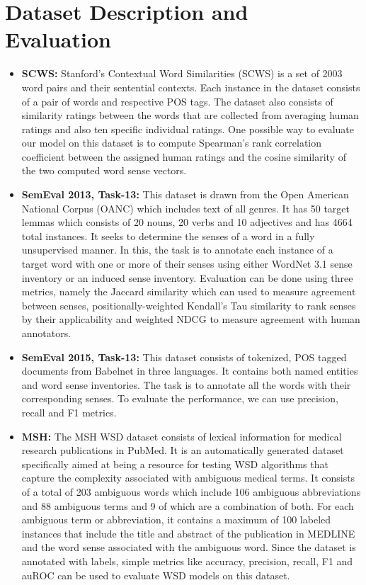 \documentclass{article}
\begin{document}
\section{Dataset Description and Evaluation}
\begin{itemize}
\item \textbf{SCWS:} Stanford’s Contextual Word Similarities (SCWS) is a set of 2003 word pairs and their sentential contexts. Each instance in the dataset consists of a pair of words and respective POS tags. The dataset also consists of similarity ratings between the words that are collected from averaging human ratings and also ten specific individual ratings. One possible way to evaluate our model on this dataset is to compute Spearman’s rank correlation coefficient between the assigned human ratings and the cosine similarity of the two computed word sense vectors.

\item \textbf{SemEval 2013, Task-13:} This dataset is drawn from the Open American National Corpus (OANC) which includes text of all genres. It has 50 target lemmas which consists of 20 nouns, 20 verbs and 10 adjectives and has 4664 total instances. It seeks to determine the senses of a word in a fully unsupervised manner. In this, the task is to annotate each instance of a target word with one or more of their senses using either WordNet 3.1 sense inventory or an induced sense inventory. Evaluation can be done using three metrics, namely the Jaccard similarity which can used to measure agreement between senses, positionally-weighted Kendall’s Tau similarity to rank senses by their applicability and weighted NDCG to measure agreement with human annotators.

\item \textbf{SemEval 2015, Task-13:} This dataset consists of tokenized, POS tagged documents from Babelnet in three languages. It contains both named entities and word sense inventories. The task is to annotate all the words with their corresponding senses. To evaluate the performance, we can use precision, recall and F1 metrics.

\item \textbf{MSH:} The MSH WSD dataset consists of lexical information for medical research publications in PubMed. It is an automatically generated dataset specifically aimed at being a resource for testing WSD algorithms that capture the complexity associated with ambiguous medical terms. It consists of a total of 203 ambiguous words which include 106 ambiguous abbreviations and 88 ambiguous terms and 9 of which are a combination of both. For each ambiguous term or abbreviation, it contains a maximum of 100 labeled instances that include the title and abstract of the publication in MEDLINE and the word sense associated with the ambiguous word. Since the dataset is annotated with labels, simple metrics like accuracy, precision, recall, F1 and auROC can be used to evaluate WSD models on this dataset.
\end{itemize}
\end{document}
